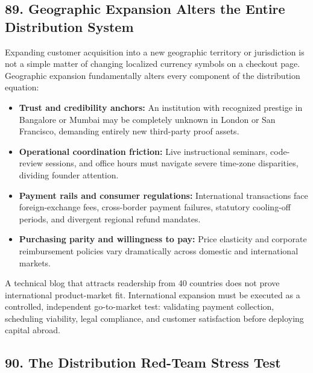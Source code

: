 \subsection*{89. Geographic Expansion Alters the Entire Distribution System}

Expanding customer acquisition into a new geographic territory or jurisdiction is not a simple matter of changing localized currency symbols on a checkout page. Geographic expansion fundamentally alters every component of the distribution equation:
\begin{itemize}[leftmargin=*,itemsep=1pt]
  \item \textbf{Trust and credibility anchors:} An institution with recognized prestige in Bangalore or Mumbai may be completely unknown in London or San Francisco, demanding entirely new third-party proof assets.
  \item \textbf{Operational coordination friction:} Live instructional seminars, code-review sessions, and office hours must navigate severe time-zone disparities, dividing founder attention.
  \item \textbf{Payment rails and consumer regulations:} International transactions face foreign-exchange fees, cross-border payment failures, statutory cooling-off periods, and divergent regional refund mandates.
  \item \textbf{Purchasing parity and willingness to pay:} Price elasticity and corporate reimbursement policies vary dramatically across domestic and international markets.
\end{itemize}

A technical blog that attracts readership from 40 countries does not prove international product-market fit. International expansion must be executed as a controlled, independent go-to-market test: validating payment collection, scheduling viability, legal compliance, and customer satisfaction before deploying capital abroad.

\subsection*{90. The Distribution Red-Team Stress Test}

